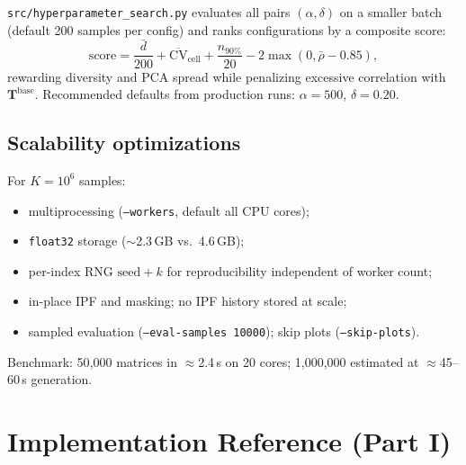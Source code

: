 \documentclass[11pt,a4paper]{report}
\newcommand{\Tbase}{\mathbf{T}^{\mathrm{base}}}
\begin{document}
\texttt{src/hyperparameter\_search.py} evaluates all pairs $(\alpha,\delta)$ on a smaller batch (default 200 samples per config) and ranks configurations by a composite score:
\begin{equation}
    \mathrm{score} = \frac{\bar{d}}{200} + \overline{\mathrm{CV}}_{\mathrm{cell}} + \frac{n_{90\%}}{20} - 2\max(0,\bar{\rho}-0.85),
\end{equation}
rewarding diversity and PCA spread while penalizing excessive correlation with $\Tbase$. Recommended defaults from production runs: $\alpha=500$, $\delta=0.20$.

\section{Scalability optimizations}

For $K=10^6$ samples:
\begin{itemize}[noitemsep]
    \item multiprocessing (\texttt{--workers}, default all CPU cores);
    \item \texttt{float32} storage ($\sim$2.3\,GB vs.\ 4.6\,GB);
    \item per-index RNG $\mathrm{seed}+k$ for reproducibility independent of worker count;
    \item in-place IPF and masking; no IPF history stored at scale;
    \item sampled evaluation (\texttt{--eval-samples 10000}); skip plots (\texttt{--skip-plots}).
\end{itemize}
Benchmark: 50{,}000 matrices in $\approx$2.4\,s on 20 cores; 1{,}000{,}000 estimated at $\approx$45--60\,s generation.


\chapter{Implementation Reference (Part I)}
\label{ch:impl1}
\end{document}
